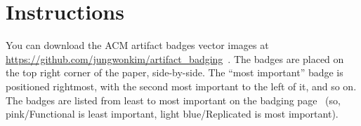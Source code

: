 \documentclass[sigplan]{acmart}
\begin{document}
\section{Instructions}
You can download the ACM artifact badges vector images at \url{https://github.com/jungwonkim/artifact\_badging}~\cite{GITHUB}. The badges are placed on the top right corner of the paper, side-by-side. The “most important” badge is positioned rightmost, with the second most important to the left of it, and so on. The badges are listed from least to most important on the badging page~\cite{ACM} (so, pink/Functional is least important, light blue/Replicated is most important).



\end{document}
